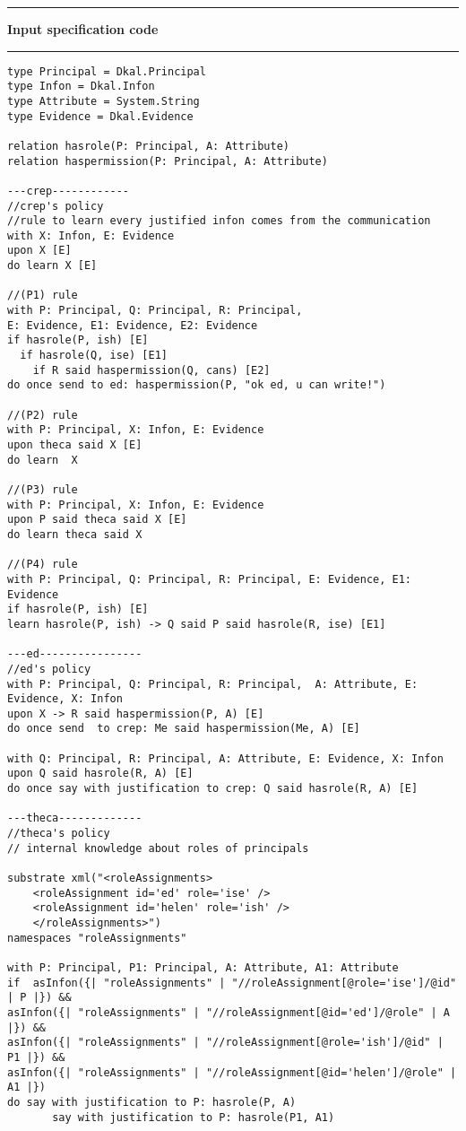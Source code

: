 \documentclass[conference]{llncs}
\begin{document}
{\hrule
\vspace*{.2cm}
\textbf{Input specification code}
\vspace*{.2cm}
\hrule
\small
\begin{verbatim}
type Principal = Dkal.Principal
type Infon = Dkal.Infon
type Attribute = System.String
type Evidence = Dkal.Evidence

relation hasrole(P: Principal, A: Attribute)
relation haspermission(P: Principal, A: Attribute)

---crep------------
//crep's policy
//rule to learn every justified infon comes from the communication
with X: Infon, E: Evidence
upon X [E]
do learn X [E]

//(P1) rule
with P: Principal, Q: Principal, R: Principal, 
E: Evidence, E1: Evidence, E2: Evidence
if hasrole(P, ish) [E]
  if hasrole(Q, ise) [E1]
    if R said haspermission(Q, cans) [E2]
do once send to ed: haspermission(P, "ok ed, u can write!")

//(P2) rule	
with P: Principal, X: Infon, E: Evidence
upon theca said X [E]
do learn  X

//(P3) rule
with P: Principal, X: Infon, E: Evidence
upon P said theca said X [E]
do learn theca said X

//(P4) rule
with P: Principal, Q: Principal, R: Principal, E: Evidence, E1: Evidence 
if hasrole(P, ish) [E]
learn hasrole(P, ish) -> Q said P said hasrole(R, ise) [E1] 

---ed----------------
//ed's policy
with P: Principal, Q: Principal, R: Principal,  A: Attribute, E: Evidence, X: Infon
upon X -> R said haspermission(P, A) [E]
do once send  to crep: Me said haspermission(Me, A) [E]

with Q: Principal, R: Principal, A: Attribute, E: Evidence, X: Infon
upon Q said hasrole(R, A) [E]
do once say with justification to crep: Q said hasrole(R, A) [E]

---theca-------------
//theca's policy
// internal knowledge about roles of principals

substrate xml("<roleAssignments>
	<roleAssignment id='ed' role='ise' />
	<roleAssignment id='helen' role='ish' />
	</roleAssignments>")
namespaces "roleAssignments"
		
with P: Principal, P1: Principal, A: Attribute, A1: Attribute
if  asInfon({| "roleAssignments" | "//roleAssignment[@role='ise']/@id" | P |}) &&
asInfon({| "roleAssignments" | "//roleAssignment[@id='ed']/@role" | A |}) &&
asInfon({| "roleAssignments" | "//roleAssignment[@role='ish']/@id" | P1 |}) &&
asInfon({| "roleAssignments" | "//roleAssignment[@id='helen']/@role" | A1 |}) 
do say with justification to P: hasrole(P, A)
	   say with justification to P: hasrole(P1, A1)
		

\end{verbatim}}
\end{document}
